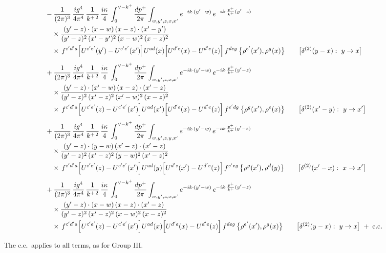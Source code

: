 \documentclass[9pt]{article}
\numberwithin{equation}{section}
\begin{document}
\begin{align}
&-\frac{1}{(2\pi)^{3}}\,\frac{ig^{4}}{4\pi^{4}}\,\frac{1}{k^{+\,2}}\,\frac{i\kappa}{4}\,\int_{0}^{\vee-k^{+}}\frac{dp^{+}}{2\pi}\int_{w,y^{\prime},z,x,x^{\prime}}e^{-ik\cdot(y^{\prime}-w)}\,e^{-ik\cdot\frac{p^{+}}{k^{+}}(y^{\prime}-z)}\notag\\&\quad\times\frac{(y^{\prime}-z)\cdot(x-w)\,(x-z)\cdot(x^{\prime}-y^{\prime})}{(y^{\prime}-z)^{2}\,(x^{\prime}-y^{\prime})^{2}\,(x-w)^{2}\,(x-z)^{2}}\notag\\&\quad\times\,f^{c^{\prime}d^{\prime}a}\Big[U^{c^{\prime}e^{\prime}}(y^{\prime})-U^{c^{\prime}e^{\prime}}(x^{\prime})\Big]U^{ad}(x)\Big[U^{d^{\prime}e}(x)-U^{d^{\prime}e}(z)\Big]\,f^{deg}\,\big\{\rho^{e^{\prime}}(x^{\prime}),\rho^{g}(x)\big\}\qquad\big[\delta^{(2)}(y-x):\ y\to x\big]\notag\\[4pt]
&+\frac{1}{(2\pi)^{3}}\,\frac{ig^{4}}{4\pi^{4}}\,\frac{1}{k^{+\,2}}\,\frac{i\kappa}{4}\,\int_{0}^{\vee-k^{+}}\frac{dp^{+}}{2\pi}\int_{w,y^{\prime},z,x,x^{\prime}}e^{-ik\cdot(y^{\prime}-w)}\,e^{-ik\cdot\frac{p^{+}}{k^{+}}(y^{\prime}-z)}\notag\\&\quad\times\frac{(y^{\prime}-z)\cdot(x^{\prime}-w)\,(x-z)\cdot(x^{\prime}-z)}{(y^{\prime}-z)^{2}\,(x^{\prime}-z)^{2}\,(x^{\prime}-w)^{2}\,(x-z)^{2}}\notag\\&\quad\times\,f^{c^{\prime}d^{\prime}a}\Big[U^{c^{\prime}e^{\prime}}(z)-U^{c^{\prime}e^{\prime}}(x^{\prime})\Big]U^{ad}(x^{\prime})\Big[U^{d^{\prime}e}(x)-U^{d^{\prime}e}(z)\Big]\,f^{e^{\prime}dg}\,\big\{\rho^{g}(x^{\prime}),\rho^{e}(x)\big\}\qquad\big[\delta^{(2)}(x^{\prime}-y):\ y\to x^{\prime}\big]\notag\\[4pt]
&+\frac{1}{(2\pi)^{3}}\,\frac{ig^{4}}{4\pi^{4}}\,\frac{1}{k^{+\,2}}\,\frac{i\kappa}{4}\,\int_{0}^{\vee-k^{+}}\frac{dp^{+}}{2\pi}\int_{w,y^{\prime},z,y,x^{\prime}}e^{-ik\cdot(y^{\prime}-w)}\,e^{-ik\cdot\frac{p^{+}}{k^{+}}(y^{\prime}-z)}\notag\\&\quad\times\frac{(y^{\prime}-z)\cdot(y-w)\,(x^{\prime}-z)\cdot(x^{\prime}-z)}{(y^{\prime}-z)^{2}\,(x^{\prime}-z)^{2}\,(y-w)^{2}\,(x^{\prime}-z)^{2}}\notag\\&\quad\times\,f^{c^{\prime}d^{\prime}a}\Big[U^{c^{\prime}e^{\prime}}(z)-U^{c^{\prime}e^{\prime}}(x^{\prime})\Big]U^{ad}(y)\Big[U^{d^{\prime}e}(x^{\prime})-U^{d^{\prime}e}(z)\Big]\,f^{e^{\prime}eg}\,\big\{\rho^{g}(x^{\prime}),\rho^{d}(y)\big\}\qquad\big[\delta^{(2)}(x^{\prime}-x):\ x\to x^{\prime}\big]\notag\\[4pt]
&+\frac{1}{(2\pi)^{3}}\,\frac{ig^{4}}{4\pi^{4}}\,\frac{1}{k^{+\,2}}\,\frac{i\kappa}{4}\,\int_{0}^{\vee-k^{+}}\frac{dp^{+}}{2\pi}\int_{w,y^{\prime},z,x,x^{\prime}}e^{-ik\cdot(y^{\prime}-w)}\,e^{-ik\cdot\frac{p^{+}}{k^{+}}(y^{\prime}-z)}\notag\\&\quad\times\frac{(y^{\prime}-z)\cdot(x-w)\,(x-z)\cdot(x^{\prime}-z)}{(y^{\prime}-z)^{2}\,(x^{\prime}-z)^{2}\,(x-w)^{2}\,(x-z)^{2}}\notag\\&\quad\times\,f^{c^{\prime}d^{\prime}a}\Big[U^{c^{\prime}e^{\prime}}(z)-U^{c^{\prime}e^{\prime}}(x^{\prime})\Big]U^{ad}(x)\Big[U^{d^{\prime}e}(x)-U^{d^{\prime}e}(z)\Big]\,f^{deg}\,\big\{\rho^{e^{\prime}}(x^{\prime}),\rho^{g}(x)\big\}\qquad\big[\delta^{(2)}(y-x):\ y\to x\big]\;+\;{\rm c.c.}
\end{align}

\noindent The c.c.\ applies to all terms, as for Group III.
\end{document}

